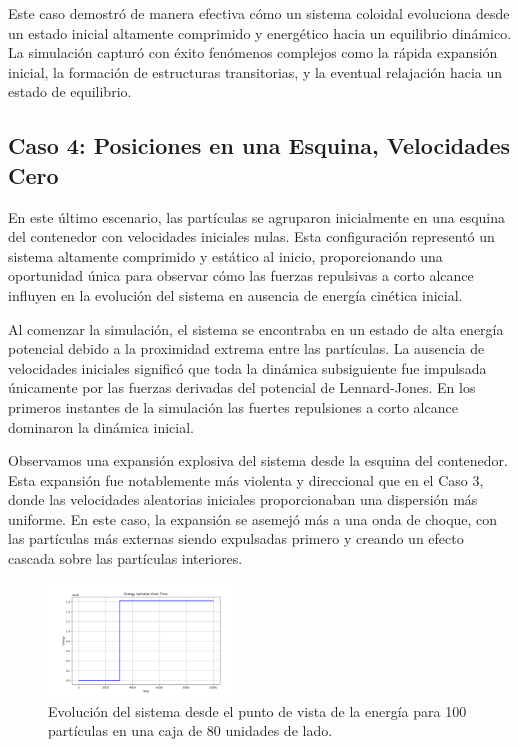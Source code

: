 \documentclass[twocolumn]{article}
\begin{document}
Este caso demostró de manera efectiva cómo un sistema coloidal evoluciona desde un estado inicial altamente comprimido y energético hacia un equilibrio dinámico. La simulación capturó con éxito fenómenos complejos como la rápida expansión inicial, la formación de estructuras transitorias, y la eventual relajación hacia un estado de equilibrio.

\subsection*{Caso 4: Posiciones en una Esquina, Velocidades Cero}

En este último escenario, las partículas se agruparon inicialmente en una esquina del contenedor con velocidades iniciales nulas. Esta configuración representó un sistema altamente comprimido y estático al inicio, proporcionando una oportunidad única para observar cómo las fuerzas repulsivas a corto alcance influyen en la evolución del sistema en ausencia de energía cinética inicial.

Al comenzar la simulación, el sistema se encontraba en un estado de alta energía potencial debido a la proximidad extrema entre las partículas. La ausencia de velocidades iniciales significó que toda la dinámica subsiguiente fue impulsada únicamente por las fuerzas derivadas del potencial de Lennard-Jones. En los primeros instantes de la simulación las fuertes repulsiones a corto alcance dominaron la dinámica inicial.

Observamos una expansión explosiva del sistema desde la esquina del contenedor. Esta expansión fue notablemente más violenta y direccional que en el Caso 3, donde las velocidades aleatorias iniciales proporcionaban una dispersión más uniforme. En este caso, la expansión se asemejó más a una onda de choque, con las partículas más externas siendo expulsadas primero y creando un efecto cascada sobre las partículas interiores.


\begin{figure}[]
    \centering
    \includegraphics[width=0.45\textwidth]{figures/variacion_energia_100p_10ki_00.png}
    \caption{Evolución del sistema desde el punto de vista de la energía para 100 partículas en una caja de 80 unidades de lado.}
    \label{fig:case4energia}
\end{figure}
\end{document}
